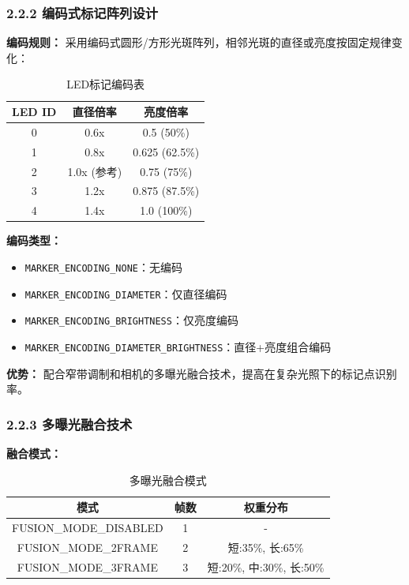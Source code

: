 \documentclass[12pt,a4paper]{article}
\begin{document}
\subsubsection{2.2.2 编码式标记阵列设计}

\textbf{编码规则：} 采用编码式圆形/方形光斑阵列，相邻光斑的直径或亮度按固定规律变化：

\begin{table}[H]
\centering
\caption{LED标记编码表}
\begin{tabular}{ccc}
\toprule
LED ID & 直径倍率 & 亮度倍率 \\
\midrule
0 & 0.6x & 0.5 (50\%) \\
1 & 0.8x & 0.625 (62.5\%) \\
2 & 1.0x (参考) & 0.75 (75\%) \\
3 & 1.2x & 0.875 (87.5\%) \\
4 & 1.4x & 1.0 (100\%) \\
\bottomrule
\end{tabular}
\end{table}

\textbf{编码类型：}
\begin{itemize}
\item \texttt{MARKER\_ENCODING\_NONE}：无编码
\item \texttt{MARKER\_ENCODING\_DIAMETER}：仅直径编码
\item \texttt{MARKER\_ENCODING\_BRIGHTNESS}：仅亮度编码
\item \texttt{MARKER\_ENCODING\_DIAMETER\_BRIGHTNESS}：直径+亮度组合编码
\end{itemize}

\textbf{优势：} 配合窄带调制和相机的多曝光融合技术，提高在复杂光照下的标记点识别率。

\subsubsection{2.2.3 多曝光融合技术}

\textbf{融合模式：}

\begin{table}[H]
\centering
\caption{多曝光融合模式}
\begin{tabular}{ccc}
\toprule
模式 & 帧数 & 权重分布 \\
\midrule
FUSION\_MODE\_DISABLED & 1 & - \\
FUSION\_MODE\_2FRAME & 2 & 短:35\%, 长:65\% \\
FUSION\_MODE\_3FRAME & 3 & 短:20\%, 中:30\%, 长:50\% \\
\bottomrule
\end{tabular}
\end{table}
\end{document}
